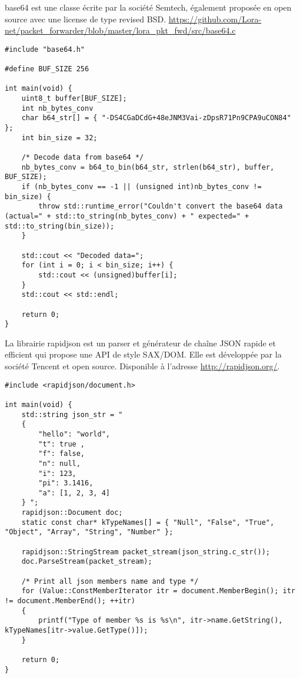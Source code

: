 base64 est une classe écrite par la société Semtech, également proposée en open source avec une license de type revised BSD. \url{https://github.com/Lora-net/packet_forwarder/blob/master/lora_pkt_fwd/src/base64.c}

\begin{lstlisting}[style=CStyle]
#include "base64.h"

#define BUF_SIZE 256

int main(void) {
	uint8_t buffer[BUF_SIZE];
	int nb_bytes_conv
	char b64_str[] = { "-DS4CGaDCdG+48eJNM3Vai-zDpsR71Pn9CPA9uCON84" };
	int bin_size = 32;

	/* Decode data from base64 */
	nb_bytes_conv = b64_to_bin(b64_str, strlen(b64_str), buffer, BUF_SIZE);
	if (nb_bytes_conv == -1 || (unsigned int)nb_bytes_conv != bin_size) {
		throw std::runtime_error("Couldn't convert the base64 data (actual=" + std::to_string(nb_bytes_conv) + " expected=" + std::to_string(bin_size));
	}

	std::cout << "Decoded data=";
	for (int i = 0; i < bin_size; i++) {
		std::cout << (unsigned)buffer[i];
	}
	std::cout << std::endl;

	return 0;
}
\end{lstlisting}

La librairie rapidjson est un parser et générateur de chaîne JSON rapide et efficient qui propose une API de style SAX/DOM. Elle est développée par la société Tencent et open source. Disponible à l'adresse \url{http://rapidjson.org/}.

\begin{lstlisting}[style=CStyle]
#include <rapidjson/document.h>

int main(void) {
	std::string json_str = "
	{
    	"hello": "world",
    	"t": true ,
    	"f": false,
    	"n": null,
    	"i": 123,
    	"pi": 3.1416,
    	"a": [1, 2, 3, 4]
	} ";
	rapidjson::Document doc;
	static const char* kTypeNames[] = { "Null", "False", "True", "Object", "Array", "String", "Number" };
	
	rapidjson::StringStream packet_stream(json_string.c_str());
	doc.ParseStream(packet_stream);
	
	/* Print all json members name and type */
	for (Value::ConstMemberIterator itr = document.MemberBegin(); itr != document.MemberEnd(); ++itr)
	{
    	printf("Type of member %s is %s\n", itr->name.GetString(), kTypeNames[itr->value.GetType()]);
	}

	return 0;
}
\end{lstlisting}


